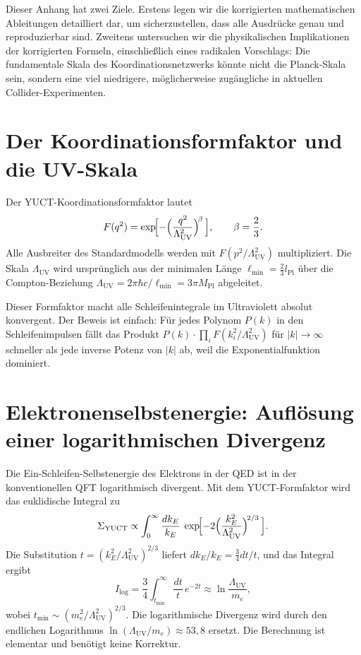 \documentclass[11pt,a4paper]{article}
\newcommand{\Mpl}{M_{\mathrm{Pl}}}
\newcommand{\Lpl}{l_{\mathrm{Pl}}}
\newcommand{\Lmin}{\ell_{\min}}
\newcommand{\LUV}{\Lambda_{\mathrm{UV}}}
\theoremstyle{remark}
\begin{document}
	Dieser Anhang hat zwei Ziele. Erstens legen wir die korrigierten mathematischen Ableitungen detailliert dar, um sicherzustellen, dass alle Ausdrücke genau und reproduzierbar sind. Zweitens untersuchen wir die physikalischen Implikationen der korrigierten Formeln, einschließlich eines radikalen Vorschlags: Die fundamentale Skala des Koordinationsnetzwerks könnte nicht die Planck-Skala sein, sondern eine viel niedrigere, möglicherweise zugängliche in aktuellen Collider-Experimenten.
	
	\section{Der Koordinationsformfaktor und die UV-Skala}
	\label{sec:formfactor}
	
	Der YUCT-Koordinationsformfaktor lautet
	\begin{equation}
		F(q^2) = \exp\!\Bigl[-\Bigl(\frac{q^2}{\LUV^2}\Bigr)^{\!\beta}\,\Bigr], \qquad \beta = \frac{2}{3}.
		\label{eq:F}
	\end{equation}
	Alle Ausbreiter des Standardmodells werden mit \(F(p^2/\LUV^2)\) multipliziert. Die Skala \(\LUV\) wird ursprünglich aus der minimalen Länge \(\Lmin = \frac{2}{3}\Lpl\) über die Compton-Beziehung \(\LUV = 2\pi\hbar c/\Lmin = 3\pi\Mpl\) abgeleitet.
	
	Dieser Formfaktor macht alle Schleifenintegrale im Ultraviolett absolut konvergent. Der Beweis ist einfach: Für jedes Polynom \(P(k)\) in den Schleifenimpulsen fällt das Produkt \(P(k) \cdot \prod_i F(k_i^2/\LUV^2)\) für \(|k| \to \infty\) schneller als jede inverse Potenz von \(|k|\) ab, weil die Exponentialfunktion dominiert.
	
	\section{Elektronenselbstenergie: Auflösung einer logarithmischen Divergenz}
	\label{sec:electron}
	
	Die Ein-Schleifen-Selbstenergie des Elektrons in der QED ist in der konventionellen QFT logarithmisch divergent. Mit dem YUCT-Formfaktor wird das euklidische Integral zu
	\begin{equation}
		\Sigma_{\mathrm{YUCT}} \propto \int_0^{\infty} \frac{dk_E}{k_E}\; \exp\!\Bigl[-2\Bigl(\frac{k_E^2}{\LUV^2}\Bigr)^{\!2/3}\,\Bigr].
		\label{eq:elec_int}
	\end{equation}
	Die Substitution \(t = (k_E^2/\LUV^2)^{2/3}\) liefert \(dk_E/k_E = \frac{3}{4} dt/t\), und das Integral ergibt
	\begin{equation}
		I_{\mathrm{log}} = \frac{3}{4} \int_{t_{\min}}^{\infty} \frac{dt}{t}\, e^{-2t} \approx \ln\frac{\LUV}{m_e},
		\label{eq:elec_result}
	\end{equation}
	wobei \(t_{\min} \sim (m_e^2/\LUV^2)^{2/3}\). Die logarithmische Divergenz wird durch den endlichen Logarithmus \(\ln(\LUV/m_e) \approx 53,8\) ersetzt. Die Berechnung ist elementar und benötigt keine Korrektur.
	
\end{document}
